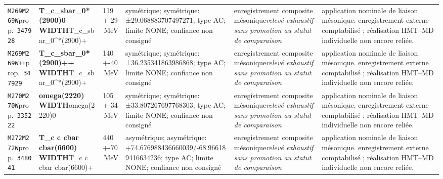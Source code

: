 \begin{landscape}
\begin{longtable}{L{1.85cm}L{4.45cm}L{2.35cm}L{4.05cm}L{3.35cm}L{7.15cm}}
\texttt{M269}\newline \texttt{M269W}\newline prop.\ \texttt{347928} & \textbf{T\_\allowbreak{}c\_\allowbreak{}sbar\_\allowbreak{}0*(2900)0 WIDTH}\newline T\_\allowbreak{}c\_\allowbreak{}sbar\_\allowbreak{}0\textasciicircum{}*(2900)+ & 119+-29\,MeV & symétrique; symétrique: ±29.068883707497271; type AC; limite NONE; confiance non consigné & enregistrement composite mésonique\newline \emph{relevé exhaustif sans promotion au statut de comparaison} & application nominale de liaison mésonique. enregistrement externe comptabilisé ; réalisation HMT--MD individuelle non encore reliée. \\
\texttt{M269}\newline \texttt{M269W++}\newline prop.\ \texttt{347929} & \textbf{T\_\allowbreak{}c\_\allowbreak{}sbar\_\allowbreak{}0*(2900)++ WIDTH}\newline T\_\allowbreak{}c\_\allowbreak{}sbar\_\allowbreak{}0\textasciicircum{}*(2900)+ & 140+-40\,MeV & symétrique; symétrique: ±36.235341863986868; type AC; limite NONE; confiance non consigné & enregistrement composite mésonique\newline \emph{relevé exhaustif sans promotion au statut de comparaison} & application nominale de liaison mésonique. enregistrement externe comptabilisé ; réalisation HMT--MD individuelle non encore reliée. \\
\texttt{M270}\newline \texttt{M270W}\newline prop.\ \texttt{335222} & \textbf{omega(2220) WIDTH}\newline omega(2220)0 & 105+-34\,MeV & symétrique; symétrique: ±33.807267697768303; type AC; limite NONE; confiance non consigné & enregistrement composite mésonique\newline \emph{relevé exhaustif sans promotion au statut de comparaison} & application nominale de liaison mésonique. enregistrement externe comptabilisé ; réalisation HMT--MD individuelle non encore reliée. \\
\texttt{M272}\newline \texttt{M272W}\newline prop.\ \texttt{348041} & \textbf{T\_\allowbreak{}c c cbar cbar(6600) WIDTH}\newline T\_\allowbreak{}c c cbar cbar(6600)+ & 440+-70\,MeV & asymétrique; asymétrique: +74.676988436660039/-68.966189416634236; type AC; limite NONE; confiance non consigné & enregistrement composite mésonique\newline \emph{relevé exhaustif sans promotion au statut de comparaison} & application nominale de liaison mésonique. enregistrement externe comptabilisé ; réalisation HMT--MD individuelle non encore reliée. \\

\end{longtable}
\end{landscape}
